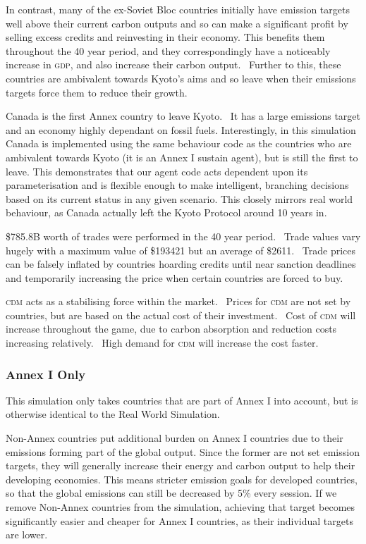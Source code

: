 In contrast, many of the ex-Soviet Bloc countries initially have emission targets well above their current carbon outputs and so can make a significant profit by selling excess credits and reinvesting in their economy. This benefits them throughout the 40 year period, and they correspondingly have a noticeably increase in \textsc{gdp}, and also increase their carbon output.  Further to this, these countries are ambivalent towards Kyoto’s aims and so leave when their emissions targets force them to reduce their growth.

Canada is the first Annex country to leave Kyoto.  It has a large emissions target and an economy highly dependant on fossil fuels. Interestingly, in this simulation Canada is implemented using the same behaviour code as the countries who are ambivalent towards Kyoto (it is an Annex I sustain agent), but is still the first to leave. This demonstrates that our agent code acts dependent upon its parameterisation and is flexible enough to make intelligent, branching decisions based on its current status in any given scenario. This closely mirrors real world behaviour, as Canada actually left the Kyoto Protocol around 10 years in.

\$785.8B worth of trades were performed in the 40 year period.  Trade values vary hugely with a maximum value of \$193421 but an average of \$2611.  Trade prices can be falsely inflated by countries hoarding credits until near sanction deadlines and temporarily increasing the price when certain countries are forced to buy.

\textsc{cdm} acts as a stabilising force within the market.  Prices for \textsc{cdm} are not set by countries, but are based on the actual cost of their investment.  Cost of \textsc{cdm} will increase throughout the game, due to carbon absorption and reduction costs increasing relatively.  High demand for \textsc{cdm} will increase the cost faster.

\subsubsection{Annex I Only}

This simulation only takes countries that are part of Annex I into account, but is otherwise identical to the Real World Simulation.

Non-Annex countries put additional burden on Annex I countries due to their emissions forming part of the global output. Since the former are not set emission targets, they will generally increase their energy and carbon output to help their developing economies. This means stricter emission goals for developed countries, so that the global emissions can still be decreased by 5\% every session. If we remove Non-Annex countries from the simulation, achieving that target becomes significantly easier and cheaper for Annex I countries, as their individual targets are lower.

